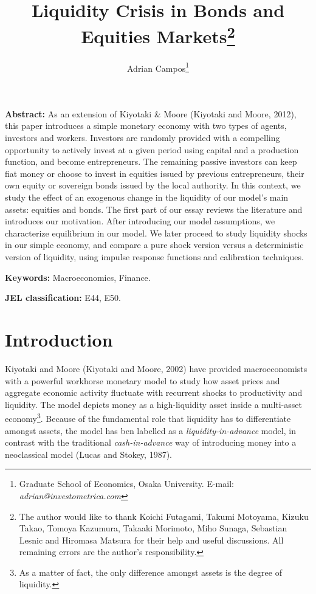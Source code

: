 \documentclass[12pt]{article}%
\begin{document}
\title{Liquidity Crisis in Bonds and Equities Markets\thanks{The author would like to thank Koichi Futagami,
Takumi Motoyama, Kizuku Takao, Tomoya Kazumura, Takaaki Morimoto, Miho Sunaga, Sebastian Lesnic and Hiromasa Matsura for their help
and useful discussions. All remaining errors are the author's responsibility.}}
\author{Adrian Campos\thanks{Graduate School of Economics, Osaka University. E-mail: \textit{adrian@investometrica.com}}}

\maketitle

\sloppy%

\onehalfspacing

\textbf{Abstract:}
As an extension of Kiyotaki \& Moore (Kiyotaki and Moore, 2012), this paper
introduces a simple monetary economy with two types of agents, investors and workers. Investors are
randomly provided with a compelling opportunity to actively invest at a given 
period using capital and a production function, and
become entrepreneurs. The remaining passive investors can keep fiat money or choose
to invest in equities issued by previous entrepreneurs, their own equity or 
sovereign bonds issued by the local authority. In this context, we study the
effect of an exogenous change in the liquidity of our model's main assets: equities and bonds. 
The first part of our essay reviews the literature and introduces our motivation.
After introducing our model assumptions, we characterize equilibrium in our model.
We later proceed to study liquidity shocks in our simple economy, and compare a pure shock version
versus a deterministic version of liquidity, using impulse response functions
and calibration techniques.
\strut

\textbf{Keywords:} Macroeconomics, Finance.

\strut
\textbf{JEL classification:} E44, E50.

\strut

\pagebreak%

\nocite{kiyotaki1,alo1,gandolfo1,lucas1,kiyotaki2,salas1,holmstrom1,bigio1}

\section{Introduction}
Kiyotaki and Moore (Kiyotaki and Moore, 2002) have provided macroeconomists with
a powerful workhorse monetary model to study how asset prices and
aggregate economic activity fluctuate with recurrent shocks to productivity and
liquidity. The model depicts money as a high-liquidity asset inside a multi-asset economy\footnote{As a matter of fact, the only difference amongst assets is the degree of liquidity.}. Because of the fundamental role that liquidity has to differentiate amongst assets, the model has ben
labelled as a \emph{liquidity-in-advance} model, in contrast with the
traditional 
\emph{cash-in-advance} way of introducing  money into a neoclassical model (Lucas and Stokey,
1987).
\end{document}
